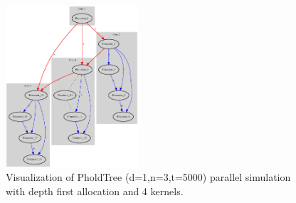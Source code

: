 \begin{figure}
	\center
	\includegraphics[width=\plotfraction\columnwidth,  height=6cm, keepaspectratio]{fig/pholdtreed1n3t5000c4DFS.eps}
	\caption{Visualization of PholdTree (d=1,n=3,t=5000) parallel simulation with depth first allocation and 4 kernels.}
	\label{fig:pholdtree_visualize_parDFS}
\end{figure}